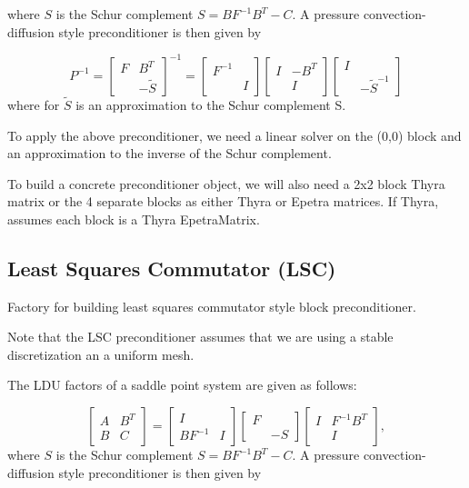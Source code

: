 \documentclass[oneeqnum,onefignum,onetabnum,10pt]{SANDreport}
\begin{document}
where $S$ is the Schur complement $S = B F^{-1} B^T - C$.  A
pressure convection-diffusion style preconditioner is then given by

\begin{equation}
  P^{-1} =
       \left[ \begin{array}{cc} F & B^T \\ & -\tilde S \end{array} \right]^{-1}
       = 
       \left[ \begin{array}{cc} F^{-1} &  \\  & I \end{array} \right]
       \left[ \begin{array}{cc} I & -B^T \\  & I \end{array} \right]
       \left[ \begin{array}{cc} I &  \\  & -\tilde S^{-1} \end{array} \right]
\end{equation}
where for $\tilde S$ is an approximation to the Schur complement S.

To apply the above preconditioner, we need a linear solver on the
(0,0) block and an approximation to the inverse of the Schur
complement.

To build a concrete preconditioner object, we will also need a 2x2
block Thyra matrix or the 4 separate blocks as either Thyra or Epetra
matrices.  If Thyra, assumes each block is a Thyra EpetraMatrix.





\subsection{Least Squares Commutator (LSC)}
Factory for building least squares commutator style block
preconditioner.  

Note that the LSC preconditioner assumes that we are using
a stable discretization an a uniform mesh.

The LDU factors of a saddle point system are given as follows:

\begin{equation}
  \left[ \begin{array}{cc} A & B^T \\ B & C \end{array} \right]
     = \left[ \begin{array}{cc} I & \\ BF^{-1} & I \end{array} \right]
       \left[ \begin{array}{cc} F & \\  & -S \end{array} \right]
       \left[ \begin{array}{cc} I & F^{-1} B^T  \\  & I \end{array} \right],
\end{equation}
where $S$ is the Schur complement $S = B F^{-1} B^T - C$.
A pressure convection-diffusion style preconditioner is then given by
     
\end{document}
